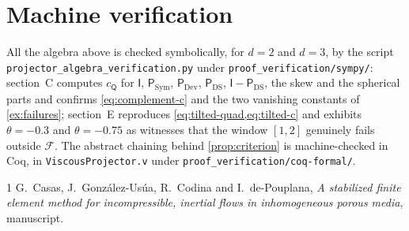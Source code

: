 \documentclass[11pt]{article}
\theoremstyle{plain}
\theoremstyle{definition}
\theoremstyle{remark}
\newcommand{\IPi}{\mathsf{I}}
\newcommand{\AnyProj}{\mathsf{Q}}
\newcommand{\DSPi}{\mathsf{P}_{\mathrm{DS}}}
\newcommand{\DPi}{\mathsf{P}_{\mathrm{Dev}}}
\newcommand{\SPi}{\mathsf{P}_{\mathrm{Sym}}}
\newcommand{\cP}{c_{\AnyProj}}
\begin{document}
\section*{Machine verification}
All the algebra above is checked symbolically, for $d=2$ and $d=3$, by the script
\texttt{projector\_\allowbreak algebra\_\allowbreak verification.py} under \texttt{proof\_\allowbreak verification/\allowbreak sympy/}:
section~C computes
$\cP$ for $\IPi$, $\SPi$, $\DPi$, $\DSPi$, $\IPi-\DSPi$, the skew and the spherical
parts and confirms \cref{eq:complement-c} and the two vanishing constants of
\cref{ex:failures}; section~E reproduces \cref{eq:tilted-quad,eq:tilted-c} and exhibits
$\theta=-0.3$ and $\theta=-0.75$ as witnesses that the window $[1,2]$ genuinely fails outside
$\mathcal{F}$. The abstract chaining behind \cref{prop:criterion} is machine{-}checked in Coq, in
\texttt{ViscousProjector.v} under \texttt{proof\_\allowbreak verification/\allowbreak coq-formal/}.

\begin{thebibliography}{1}
G.~Casas, J.~Gonz\'alez-Us\'ua, R.~Codina and I.~de-Pouplana,
\emph{A stabilized finite element method for incompressible, inertial flows in inhomogeneous
porous media}, manuscript.
\end{thebibliography}
\end{document}
